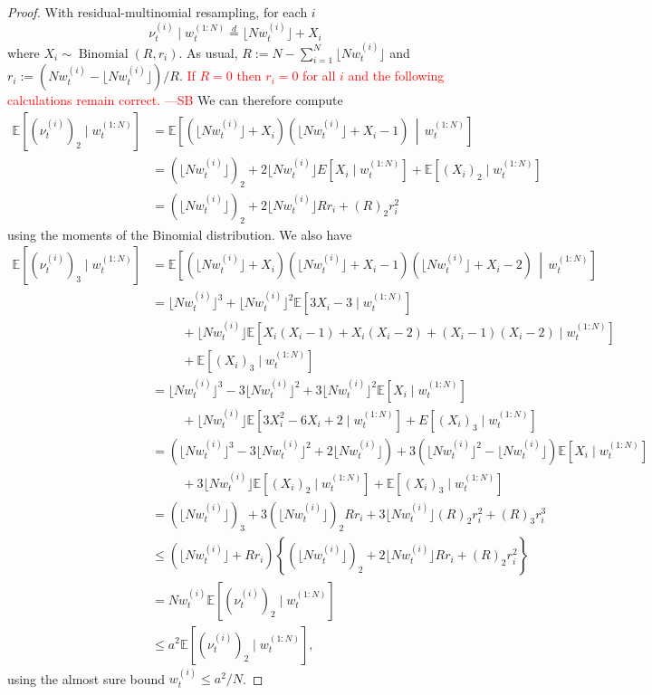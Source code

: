 \documentclass{article}
\newcommand{\seb}[1]{\xspace\textcolor{red}{#1 ---SB}\xspace} %
\theoremstyle{definition}
\newcommand{\E}{\mathbb{E}}
\newcommand{\eqdist}{\overset{d}{=}}
\newcommand{\1}[1]{\mathbbm{1}_{#1}} %
\newcommand{\midd}{\,\middle|\,}        %
\newcommand{\Bin}{\operatorname{Binomial}}
\newcommand{\flnw}[1][i]{\lfloor N w_t^{(#1)} \rfloor}
\begin{document}
\begin{proof}
With residual-multinomial resampling, for each $i$
\begin{equation*}
\nu_t^{(i)} \mid w_t^{(1:N)}
\eqdist \flnw + X_i
\end{equation*}
where $X_i \sim \Bin(R, r_i)$. As usual, $R := N - \sum_{i=1}^N \flnw$ and $r_i := ( Nw_t^{(i)} - \flnw ) /R$.
\seb{If $R=0$ then $r_i = 0$ for all $i$ and the following calculations remain correct.}
We can therefore compute
\begin{align*}
\E [ (\nu_t^{(i)})_2 \mid w_t^{(1:N)} ]
&= \E\left[ (\flnw + X_i) (\flnw + X_i -1) \midd w_t^{(1:N)} \right] \\
&= (\flnw)_2 + 2\flnw E[ X_i \mid w_t^{(1:N)} ] + \E[ (X_i)_2 \mid w_t^{(1:N)} ] \\
&= (\flnw)_2 + 2\flnw R r_i + (R)_2 r_i^2
\end{align*}
using the moments of the Binomial distribution.
We also have
\begin{align*}
\E [ (\nu_t^{(i)})_3 \mid w_t^{(1:N)} ]
&= \E\left[ (\flnw + X_i) (\flnw + X_i -1) (\flnw + X_i -2) \midd w_t^{(1:N)} \right] \\
&= \flnw^3 + \flnw^2 \E[ 3X_i -3 \mid w_t^{(1:N)} ] \\
    &\hspace{1cm}+ \flnw 
        \E[ X_i(X_i-1) + X_i(X_i-2) + (X_i-1)(X_i-2) \mid w_t^{(1:N)} ] \\
    &\hspace{1cm}+ \E[ (X_i)_3 \mid w_t^{(1:N)} ] \\
&= \flnw^3 - 3\flnw^2 +3\flnw^2 \E[ X_i \mid w_t^{(1:N)} ] \\
    &\hspace{1cm}+ \flnw \E[ 3X_i^2 - 6X_i +2 \mid w_t^{(1:N)} ] 
        + E[(X_i)_3 \mid w_t^{(1:N)} ]\\
&= \left( \flnw^3 - 3\flnw^2 + 2\flnw \right)
        + 3 \left( \flnw^2 - \flnw \right) \E[ X_i \mid w_t^{(1:N)} ] \\
    &\hspace{1cm}+ 3 \flnw \E[ (X_i)_2 \mid w_t^{(1:N)} ] 
        + \E[ (X_i)_3 \mid w_t^{(1:N)} ] \\
&= (\flnw)_3 + 3(\flnw)_2 R r_i + 3\flnw (R)_2 r_i^2 + (R)_3 r_i^3 \\
&\leq \left( \flnw + R r_i \right) \left\{ (\flnw)_2 + 2\flnw R r_i 
        + (R)_2 r_i^2 \right\} \\
&= Nw_t^{(i)} \E[(\nu_t^{(i)})_2 \mid w_t^{(1:N)} ] \\
&\leq a^2 \E[(\nu_t^{(i)})_2 \mid w_t^{(1:N)} ] ,
\end{align*}
using the almost sure bound $w_t^{(i)} \leq a^2/N$.


\end{proof}
\end{document}
